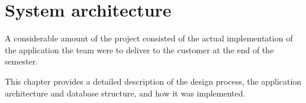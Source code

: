 \chapter{System architecture}

A considerable amount of the project consisted of the actual implementation of the application the team were to deliver to the customer at the end of the semester. 

This chapter provides a detailed description of the design process, the application architecture and database structure, and how it was implemented.



